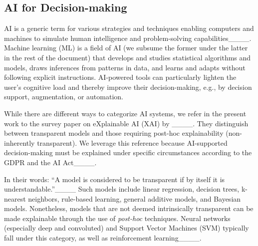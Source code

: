 \subsection{AI for Decision-making}
\label{subsec:AI}
AI is a generic term for various strategies and techniques enabling computers and machines to simulate human intelligence and problem-solving capabilities____.
Machine learning (ML) is a field of AI (we subsume the former under the latter in the rest of the document) that develops and studies statistical algorithms and models, draws inferences from patterns in data, and learns and adapts without following explicit instructions.
AI-powered tools can particularly lighten the user's cognitive load and thereby improve their decision-making, e.g., by decision support, augmentation, or automation. 

While there are different ways to categorize AI systems, we refer in the present work to the survey paper on eXplainable AI (XAI) by ____.
They distinguish between transparent models and those requiring post-hoc explainability (non-inherently transparent).
We leverage this reference because AI-supported decision-making must be explained under specific circumstances according to the GDPR and the AI Act____.

In their words: ``A model is considered to be transparent if by itself it is understandable.''____
Such models include linear regression, decision trees, k-nearest neighbors, rule-based learning, general additive models, and Bayesian models.
Nonetheless, models that are not deemed intrinsically transparent can be made explainable through the use of \textit{post-hoc} techniques.
Neural networks (especially deep and convoluted) and Support Vector Machines (SVM) typically fall under this category, as well as reinforcement learning____.



